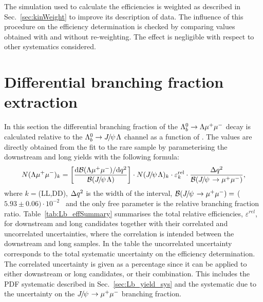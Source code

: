 The simulation used to calculate the efficiencies is weighted as described in Sec.~\ref{sec:kinWeight} to 
improve its description of data.
The influence of this procedure on the efficiency determination is checked by comparing values obtained with
and without re-weighting. The effect is negligible with respect to other systematics considered.



\section{Differential branching fraction extraction}
\label{sec:Lb_BRsummary}

In this section the differential branching fraction of the $\Lambda^0_b\rightarrow\Lambda\mu^+\mu^-$ decay is calculated 
relative to the $\Lb\ra\jpsi\Lz$ channel as a function of \qsq.
The values are directly obtained from the fit to the rare sample by parameterising
the downstream and long yields with the following formula:
%
\begin{equation}
N(\Lz\mumu)_{k}  = \left[ \frac{\mathrm{d}\mathcal{B}(\Lz\mumu)/\mathrm{d}\qsq}{\mathcal{B}(\jpsi\Lz)} \right]  \cdot
N(\jpsi\Lz)_{k} \cdot \varepsilon^{\mathrm{rel}}_{k} \cdot \frac {\Delta\qsq} { \mathcal{B}(\jpsi\to\mumu) },
\label{eq:ield_from_BR}
\end{equation}
\noindent
where $k = $(LL,DD), $\Delta q^2$ is the width of the \qsq interval, 
\mbox{$\mathcal{B}(\jpsi\to\mumu) =$} ($5.93 \pm 0.06)\cdot 10^{-2}$~\cite{PDG2014} and the only free parameter
is the relative branching fraction ratio. Table~\ref{tab:Lb_effSummary} summarises the total relative efficiencies, 
$\varepsilon^{rel}$, for downstream and long candidates together with their correlated and uncorrelated uncertainties, 
where the correlation is intended between the downstream and long samples. In the table the uncorrelated uncertainty 
corresponds to the total systematic uncertainty on the efficiency determination.
The correlated uncertainty is given as a percentage since it can be applied to either downstream or long candidates,  
or their combination. This includes the PDF systematic described in Sec.~\ref{sec:Lb_yield_sys} and the systematic 
due to the uncertainty on the $\jpsi\to\mumu$ branching fraction.

